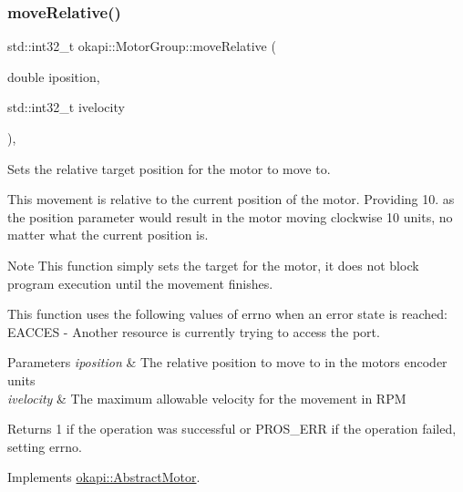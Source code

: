 \subsubsection{\texorpdfstring{moveRelative()}{moveRelative()}}
{\footnotesize\ttfamily std\+::int32\+\_\+t okapi\+::\+Motor\+Group\+::move\+Relative (\begin{DoxyParamCaption}\item[{double}]{iposition,  }\item[{std\+::int32\+\_\+t}]{ivelocity }\end{DoxyParamCaption})\hspace{0.3cm}{\ttfamily [override]}, {\ttfamily [virtual]}}

Sets the relative target position for the motor to move to.

This movement is relative to the current position of the motor. Providing 10. as the position parameter would result in the motor moving clockwise 10 units, no matter what the current position is.

\begin{DoxyNote}{Note}
This function simply sets the target for the motor, it does not block program execution until the movement finishes.
\end{DoxyNote}
This function uses the following values of errno when an error state is reached\+: E\+A\+C\+C\+ES -\/ Another resource is currently trying to access the port.


\begin{DoxyParams}{Parameters}
{\em iposition} & The relative position to move to in the motor\textquotesingle{}s encoder units \\
\hline
{\em ivelocity} & The maximum allowable velocity for the movement in R\+PM \\
\hline
\end{DoxyParams}
\begin{DoxyReturn}{Returns}
1 if the operation was successful or {\ttfamily P\+R\+O\+S\+\_\+\+E\+RR} if the operation failed, setting errno. 
\end{DoxyReturn}


Implements \mbox{\hyperlink{classokapi_1_1AbstractMotor_a5a65d70a30f536593326cb754700e240}{okapi\+::\+Abstract\+Motor}}.

\mbox{\label{classokapi_1_1MotorGroup_a9f31c14e92efe7ab492b2c335c51b488}} 
